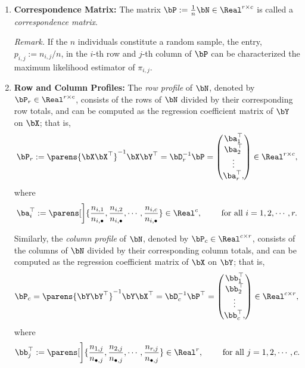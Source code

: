 \documentclass[12pt]{article}
\begin{document}
\begin{enumerate}[label=\textbf{\arabic*.}]
	\item \textbf{Correspondence Matrix:} The matrix $\bP := \frac{1}{n} \bN \in \Real^{r \times c}$ is called a \emph{correspondence matrix}. 
	
	\textit{Remark.} If the $n$ individuals constitute a random sample, the entry, $p_{i,j} := n_{i,j}/n$, in the $i$-th row and $j$-th column of $\bP$ can be characterized the maximum likelihood estimator of $\pi_{i,j}$. 
	
	\item \textbf{Row and Column Profiles:} The \emph{row profile} of $\bN$, denoted by $\bP_r \in \Real^{r \times c}$, consists of the rows of $\bN$ divided by their corresponding row totals, and can be computed as the regression coefficient matrix of $\bY$ on $\bX$; that is, 
	\begin{align*}
		\bP_r := \parens{\bX \bX^\top}^{-1} \bX \bY^\top = \bD_r^{-1} \bP = \begin{pmatrix}
			\ba_1^\top \\ \ba_2^\top \\ \vdots \\ \ba_r^\top, 
		\end{pmatrix} \in \Real^{r \times c}, 
	\end{align*}
	where 
	\begin{align*}
		\ba_i^\top := \parens[\bigg]{\frac{n_{i,1}}{n_{i,\bullet}}, \frac{n_{i,2}}{n_{i,\bullet}}, \cdots, \frac{n_{i,c}}{n_{i,\bullet}}} \in \Real^c, \qquad \text{ for all } i = 1, 2, \cdots, r. 
	\end{align*}
	
	Similarly, the \emph{column profile} of $\bN$, denoted by $\bP_c \in \Real^{c \times r}$, consists of the columns of $\bN$ divided by their corresponding column totals, and can be computed as the regression coefficient matrix of $\bX$ on $\bY$; that is, 
	\begin{align*}
		\bP_c = \parens{\bY \bY^\top}^{-1} \bY \bX^\top = \bD_c^{-1} \bP^\top = \begin{pmatrix}
			\bb_1^\top \\ \bb_2^\top \\ \vdots \\ \bb_c^\top, 
		\end{pmatrix} \in \Real^{c \times r}, 
	\end{align*}
	where 
	\begin{align*}
		\bb_j^\top := \parens[\bigg]{\frac{n_{1,j}}{n_{\bullet,j}}, \frac{n_{2,j}}{n_{\bullet,j}}, \cdots, \frac{n_{r,j}}{n_{\bullet,j}}} \in \Real^r, \qquad \text{ for all } j = 1, 2, \cdots, c. 
	\end{align*}
	

\end{enumerate}
\end{document}
